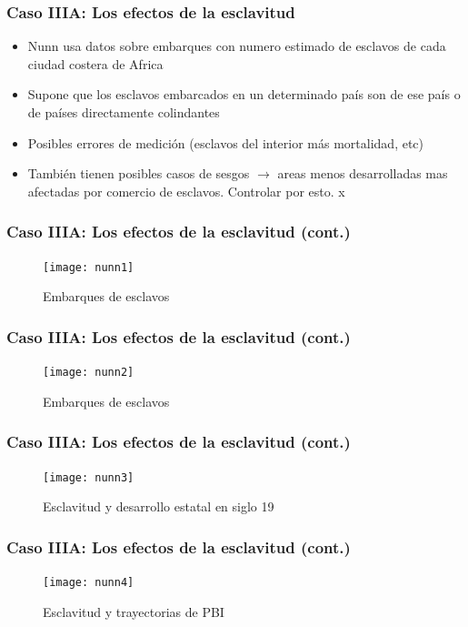 \documentclass[handout,final,xcolor=dvipsnames]{beamer}
\begin{document}
\begin{frame}\frametitle{Caso IIIA: Los efectos de la esclavitud}
\begin{itemize}\itemsep 15pt
\item Nunn usa datos sobre embarques con numero estimado de esclavos
  de cada ciudad costera de Africa
  \item Supone que los esclavos embarcados en un determinado país son
    de ese país o de países directamente colindantes
    \item Posibles errores de medición (esclavos del interior más
      mortalidad, etc)
      \item También tienen posibles casos de sesgos $\longrightarrow$
        areas menos desarrolladas mas afectadas por comercio de
        esclavos. Controlar por esto. x
    \end{itemize}
\end{frame}



\begin{frame}\frametitle{Caso IIIA: Los efectos de la esclavitud (cont.)}
   \begin{figure}[htbp]
    \centering \vspace{0cm}
    \texttt{[image: nunn1]}
    \caption{Embarques de esclavos}
    \label{fig:ar1}
  \end{figure}
\end{frame}


\begin{frame}\frametitle{Caso IIIA: Los efectos de la esclavitud (cont.)}
   \begin{figure}[htbp]
    \centering \vspace{0cm}
    \texttt{[image: nunn2]}
    \caption{Embarques de esclavos}
    \label{fig:ar1}
  \end{figure}
\end{frame}

\begin{frame}\frametitle{Caso IIIA: Los efectos de la esclavitud (cont.)}
\begin{figure}[htbp]
    \centering \vspace{0cm}
    \texttt{[image: nunn3]}
    \caption{Esclavitud y desarrollo estatal en siglo 19}
    \label{fig:arj1}
  \end{figure}
\end{frame}


\begin{frame}\frametitle{Caso IIIA: Los efectos de la esclavitud (cont.)}
\begin{figure}[htbp]
    \centering \vspace{0cm}
    \texttt{[image: nunn4]}
    \caption{Esclavitud y trayectorias de PBI}
    \label{fig:arj1}
  \end{figure}
\end{frame}
\end{document}
